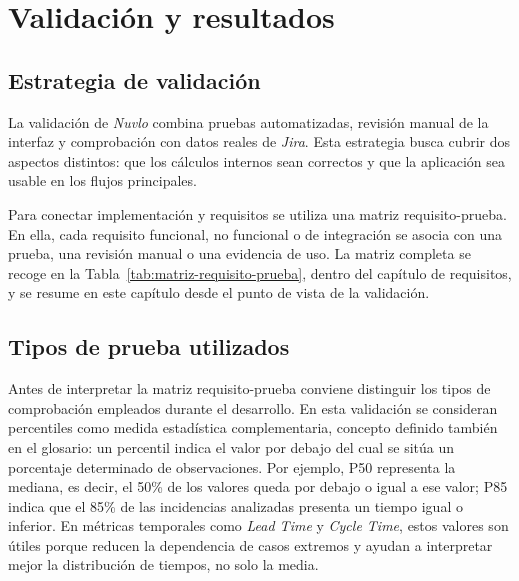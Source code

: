 \chapter{Validación y resultados}

\section{Estrategia de validación}

La validación de \textit{Nuvlo} combina pruebas automatizadas, revisión manual de la interfaz y comprobación con datos reales de \textit{Jira}. Esta estrategia busca cubrir dos aspectos distintos: que los cálculos internos sean correctos y que la aplicación sea usable en los flujos principales.

Para conectar implementación y requisitos se utiliza una matriz requisito-prueba. En ella, cada requisito funcional, no funcional o de integración se asocia con una prueba, una revisión manual o una evidencia de uso. La matriz completa se recoge en la Tabla~\ref{tab:matriz-requisito-prueba}, dentro del capítulo de requisitos, y se resume en este capítulo desde el punto de vista de la validación.

\section{Tipos de prueba utilizados}

Antes de interpretar la matriz requisito-prueba conviene distinguir los tipos de comprobación empleados durante el desarrollo. En esta validación se consideran percentiles como medida estadística complementaria, concepto definido también en el glosario: un percentil indica el valor por debajo del cual se sitúa un porcentaje determinado de observaciones. Por ejemplo, P50 representa la mediana, es decir, el 50\% de los valores queda por debajo o igual a ese valor; P85 indica que el 85\% de las incidencias analizadas presenta un tiempo igual o inferior. En métricas temporales como \textit{Lead Time} y \textit{Cycle Time}, estos valores son útiles porque reducen la dependencia de casos extremos y ayudan a interpretar mejor la distribución de tiempos, no solo la media.

